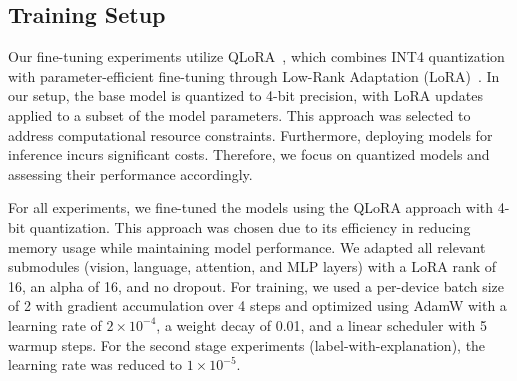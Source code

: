 \subsection{Training Setup}
Our fine-tuning experiments utilize QLoRA~\cite{dettmers2023qloraefficientfinetuningquantized}, which combines INT4 quantization with parameter-efficient fine-tuning through Low-Rank Adaptation (LoRA)~\cite{hu2021lora}. In our setup, the base model is quantized to 4-bit precision, with LoRA updates applied to a subset of the model parameters. 
This approach was selected to address computational resource constraints. Furthermore, deploying models for inference incurs significant costs. Therefore, we focus on quantized models and assessing their performance accordingly.

For all experiments, we fine-tuned the models using the QLoRA approach with 4-bit quantization. This approach was chosen due to its efficiency in reducing memory usage while maintaining model performance. We adapted all relevant submodules (vision, language, attention, and MLP layers) with a LoRA rank of 16, an alpha of 16, and no dropout. For training, we used a per-device batch size of 2 with gradient accumulation over 4 steps and optimized using AdamW with a learning rate of $2\times10^{-4}$, a weight decay of 0.01, and a linear scheduler with 5 warmup steps. For the second stage experiments (label-with-explanation), the learning rate was reduced to $1\times10^{-5}$.
 






